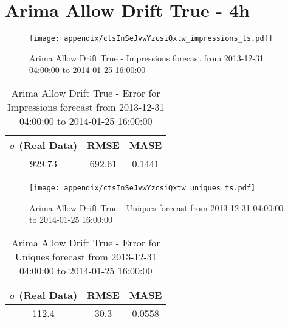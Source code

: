 \section{Arima Allow Drift True - 4h}
\begin{figure}[H] \begin{center} \leavevmode
\texttt{[image: appendix/ctsInSeJvwYzcsiQxtw\_impressions\_ts.pdf]} \caption{
Arima Allow Drift True - Impressions forecast from 2013-12-31 04:00:00 to 2014-01-25 16:00:00} \label{fig:appendix/ctsInSeJvwYzcsiQxtw_impressions_ts.pdf} \end{center}
\end{figure}

\begin{table}[H]
\centering
\footnotesize
\begin{tabular}{ccc}
$\sigma$ (Real Data) & RMSE & MASE   \\ \hline
929.73 & 692.61 & 0.1441 \\
\end{tabular}

\vspace{0.5cm}

\caption{
Arima Allow Drift True - Error for Impressions forecast from 2013-12-31 04:00:00 to 2014-01-25 16:00:00}
\end{table}

\begin{figure}[H] \begin{center} \leavevmode
\texttt{[image: appendix/ctsInSeJvwYzcsiQxtw\_uniques\_ts.pdf]} \caption{
Arima Allow Drift True - Uniques forecast from 2013-12-31 04:00:00 to 2014-01-25 16:00:00} \label{fig:appendix/ctsInSeJvwYzcsiQxtw_uniques_ts.pdf} \end{center}
\end{figure}

\begin{table}[H]
\centering
\footnotesize
\begin{tabular}{ccc}
$\sigma$ (Real Data) & RMSE & MASE   \\ \hline
112.4 & 30.3 & 0.0558 \\
\end{tabular}

\vspace{0.5cm}

\caption{
Arima Allow Drift True - Error for Uniques forecast from 2013-12-31 04:00:00 to 2014-01-25 16:00:00}
\end{table}


